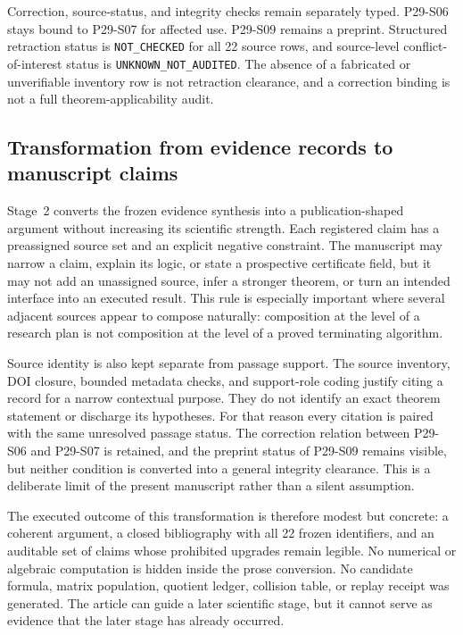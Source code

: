 \documentclass[11pt,a4paper]{article}
\begin{document}
Correction, source-status, and integrity checks remain separately typed. P29-S06 stays bound to P29-S07 for affected use. P29-S09 remains a preprint. Structured retraction status is \texttt{NOT\_CHECKED} for all 22 source rows, and source-level conflict-of-interest status is \texttt{UNKNOWN\_NOT\_AUDITED}. The absence of a fabricated or unverifiable inventory row is not retraction clearance, and a correction binding is not a full theorem-applicability audit.

\subsection{Transformation from evidence records to manuscript claims}

Stage~2 converts the frozen evidence synthesis into a publication-shaped argument without increasing its scientific strength. Each registered claim has a preassigned source set and an explicit negative constraint. The manuscript may narrow a claim, explain its logic, or state a prospective certificate field, but it may not add an unassigned source, infer a stronger theorem, or turn an intended interface into an executed result. This rule is especially important where several adjacent sources appear to compose naturally: composition at the level of a research plan is not composition at the level of a proved terminating algorithm.

Source identity is also kept separate from passage support. The source inventory, DOI closure, bounded metadata checks, and support-role coding justify citing a record for a narrow contextual purpose. They do not identify an exact theorem statement or discharge its hypotheses. For that reason every citation is paired with the same unresolved passage status. The correction relation between P29-S06 and P29-S07 is retained, and the preprint status of P29-S09 remains visible, but neither condition is converted into a general integrity clearance. This is a deliberate limit of the present manuscript rather than a silent assumption.

The executed outcome of this transformation is therefore modest but concrete: a coherent argument, a closed bibliography with all 22 frozen identifiers, and an auditable set of claims whose prohibited upgrades remain legible. No numerical or algebraic computation is hidden inside the prose conversion. No candidate formula, matrix population, quotient ledger, collision table, or replay receipt was generated. The article can guide a later scientific stage, but it cannot serve as evidence that the later stage has already occurred.
\end{document}
